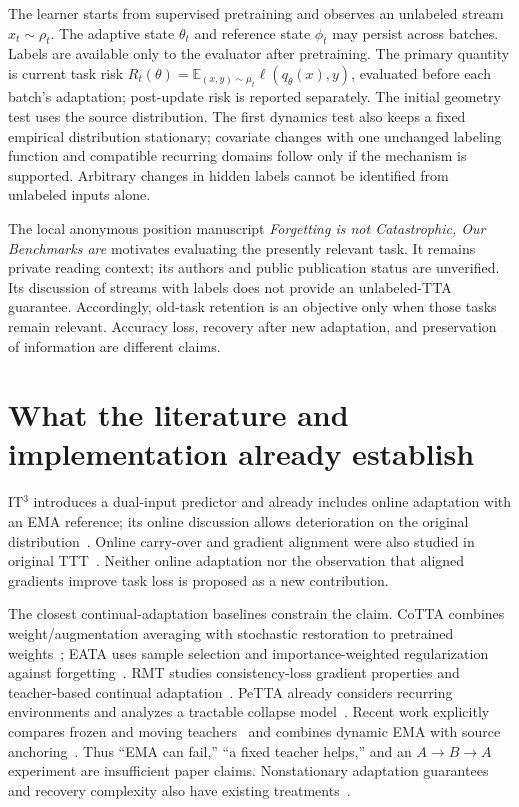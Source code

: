 \documentclass[11pt,a4paper]{article}
\newcommand{\E}{\mathbb{E}}
\begin{document}
The learner starts from supervised pretraining and observes an unlabeled
stream $x_t\sim\rho_t$. The adaptive state $\theta_t$ and reference state
$\phi_t$ may persist across batches. Labels are available only to the
evaluator after pretraining. The primary quantity is current task risk
$R_t(\theta)=\E_{(x,y)\sim\mu_t}\ell(q_\theta(x),y)$, evaluated before each
batch's adaptation; post-update risk is reported separately. The initial geometry test uses the source distribution. The first dynamics
test also keeps a fixed empirical distribution stationary; covariate changes with one
unchanged labeling function and compatible recurring domains follow only
if the mechanism is supported. Arbitrary changes in hidden
labels cannot be identified from unlabeled inputs alone.

The local anonymous position manuscript \emph{Forgetting is not Catastrophic,
Our Benchmarks are} motivates evaluating the presently relevant task.
It remains private reading context; its authors and public publication
status are unverified. Its discussion of streams with labels does not
provide an unlabeled-TTA guarantee. Accordingly, old-task retention is an
objective only when those tasks remain relevant. Accuracy loss, recovery
after new adaptation, and preservation of information are different claims.

\section{What the literature and implementation already establish}
IT$^3$ introduces a dual-input predictor and already includes online
adaptation with an EMA reference; its online discussion allows deterioration
on the original distribution~\cite{it3}. Online carry-over and gradient
alignment were also studied in original TTT~\cite{ttt}. Neither online
adaptation nor the observation that aligned gradients improve task loss
is proposed as a new contribution.

The closest continual-adaptation baselines constrain the claim. CoTTA
combines weight/augmentation averaging with stochastic restoration to
pretrained weights~\cite{cotta}; EATA uses sample selection and
importance-weighted regularization against forgetting~\cite{eata}.
RMT studies consistency-loss gradient properties and teacher-based
continual adaptation~\cite{rmt}. PeTTA already considers recurring
environments and analyzes a tractable collapse model~\cite{petta}.
Recent work explicitly compares frozen and moving teachers~\cite{fixedteacher}
and combines dynamic EMA with source anchoring~\cite{desa}. Thus ``EMA can
fail,'' ``a fixed teacher helps,'' and an $A\to B\to A$ experiment are
insufficient paper claims. Nonstationary adaptation guarantees and recovery
complexity also have existing treatments~\cite{realign,recovery}.
\end{document}
